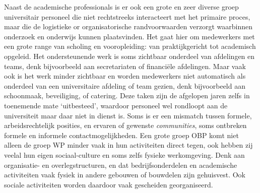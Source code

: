 \documentclass[smallauthor, chapterhaspagenum, nochapterinheader, pagenuminheader,  bigchapnum,medium2, tocpages, garamond, titleinheader]{jote-book}
\begin{document}
	Naast de academische professionals is er ook een grote en zeer diverse groep universitair personeel die niet rechtstreeks interacteert met het primaire proces, maar die de logistieke or organisatorische randvoorwaarden verzorgt waarbinnen onderzoek en onderwijs kunnen plaatsvinden. Het gaat hier om medewerkers met een grote range van scholing en vooropleiding: van praktijkgericht tot academisch opgeleid. Het ondersteunende werk is soms zichtbaar onderdeel van afdelingen en teams, denk bijvoorbeeld aan secretariaten of financiële afdelingen. Maar vaak ook is het werk minder zichtbaar en worden medewerkers niet automatisch als onderdeel van een universitaire afdeling of team gezien, denk bijvoorbeeld aan schoonmaak, beveiliging, of catering. Deze taken zijn de afgelopen jaren zelfs in toenemende mate ‘uitbesteed', waardoor personeel wel rondloopt aan de universiteit maar daar niet in dienst is. Soms is er een mismatch tussen formele, arbeidsrechtelijk posities, en ervaren of gewenste \emph{communities}, soms ontbreken formele en informele contactmogelijkheden. Een grote groep OBP komt niet alleen de groep WP minder vaak in hun activiteiten direct tegen, ook hebben zij veelal hun eigen sociaal-culture en soms zelfs fysieke werkomgeving. Denk aan organisatie- en overlegstructuren, en dat bedrijfsonderdelen en academische activiteiten vaak fysiek in andere gebouwen of bouwdelen zijn gehuisvest. Ook sociale activiteiten worden daardoor vaak gescheiden georganiseerd.
\end{document}
